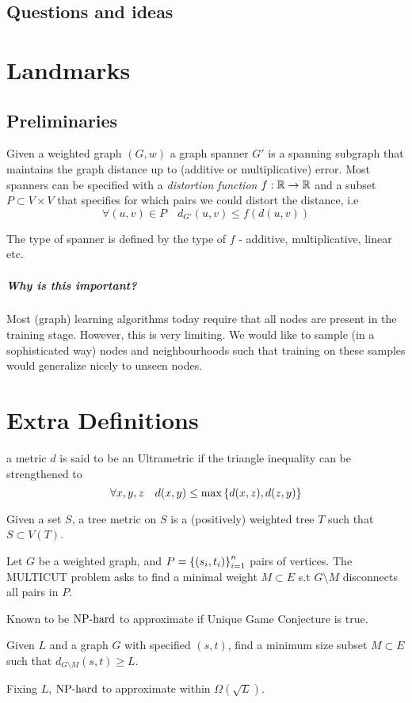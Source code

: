 \documentclass[a4paper, 10pt]{book}
\begin{document}
	\section{Questions and ideas}
	
	\chapter{Landmarks}
	\section{Preliminaries}
	\begin{defn}
		Given a weighted graph $(G,w)$ a graph spanner $G'$ is a spanning subgraph that maintains the graph distance up to (additive or multiplicative) error. 
		Most spanners can be specified with a \emph{distortion function} $f:\mathbb{R}\to \mathbb{R}$ and a subset $P\subset V\times V$ that specifies for which pairs we could distort the distance, i.e
	\[
	\forall(u,v)\in P\quad d_{G'}(u,v)\le f(d(u,v))
	\]
	\end{defn}
	The type of spanner is defined by the type of $f$ - additive, multiplicative, linear etc.
	
	\paragraph{Why is this important?} 
	Most (graph) learning algorithms today require that all nodes are present in the training stage. However, this is very limiting. We would like to sample (in a sophisticated way) nodes and neighbourhoods such that training on these samples would generalize nicely to unseen nodes. 
	\appendix
	\chapter{Extra Definitions}
	\begin{defn}
		[Ultrametric] a metric $d$ is said to be an Ultrametric if the triangle inequality can be strengthened to \[
		\forall x,y,z \quad d(x,y) \le \max\left\{d(x,z),d(z,y)\right\}
		\]
	\end{defn}
	\begin{defn}
		 Given a set $S$, a tree metric on $S$ is a (positively) weighted tree $T$ such that $S\subset V(T)$.
	\end{defn}
	\begin{defn}
		[MULTICUT] Let $G$ be a weighted graph, and $P = \left\{(s_i,t_i)\right\}_{i=1}^n$ pairs of vertices. The MULTICUT problem asks to find a minimal weight $M\subset E$ s.t $G\setminus M$ disconnects all pairs in $P$.
	\end{defn}
	\begin{remark}
		Known to be $\operatorname{NP-hard}$ to approximate if Unique Game Conjecture is true.
	\end{remark}
	\begin{defn}
		[LB-CUT] Given $L$ and a graph $G$ with specified $(s,t)$, find a minimum size subset $M\subset E$ such that $d_{G\setminus M}(s,t)\ge L$.
	\end{defn}
	\begin{remark}
		Fixing $L$, $\operatorname{NP-hard}$ to approximate within $\Omega(\sqrt{L})$.
	\end{remark}

	




\end{document}
